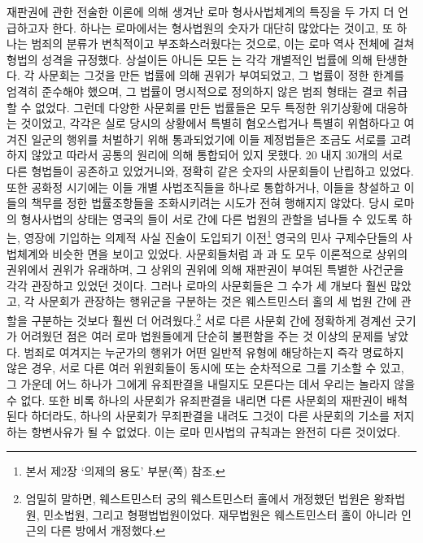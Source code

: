 재판권에 관한 전술한 이론에 의해 생겨난
로마 형사사법체계의 특징을 두 가지 더 언급하고자 한다.
하나는 로마에서는 형사법원의 숫자가 대단히 많았다는 것이고,
또 하나는
범죄의 분류가 변칙적이고 부조화스러웠다는 것으로, 이는
로마 역사 전체에 걸쳐 형법의 성격을 규정했다.
상설이든 아니든 모든 는
각각 개별적인 법률에 의해 탄생한다.
각 사문회는 그것을 만든 법률에 의해 권위가 부여되었고,
그 법률이 정한 한계를 엄격히 준수해야 했으며,
그 법률이 명시적으로 정의하지 않은 범죄 형태는 결코 취급할 수 없었다.
그런데 다양한 사문회를 만든 법률들은
모두 특정한 위기상황에 대응하는 것이었고,
각각은 실로 당시의 상황에서
특별히 혐오스럽거나 특별히 위험하다고 여겨진
일군의 행위를 처벌하기 위해 통과되었기에
이들 제정법들은 조금도 서로를 고려하지 않았고
따라서 공통의 원리에 의해 통합되어 있지 못했다.
20 내지 30개의 서로 다른 형법들이 공존하고 있었거니와,
정확히 같은 숫자의 사문회들이 난립하고 있었다.
또한 공화정 시기에는
이들 개별 사법조직들을 하나로 통합하거나,
이들을 창설하고 이들의 책무를 정한 법률조항들을 조화시키려는
시도가 전혀 행해지지 않았다.
당시 로마의 형사사법의 상태는
영국의 들이
서로 간에 다른 법원의 관할을 넘나들 수 있도록 하는,
영장에 기입하는
의제적 사실 진술이
도입되기 이전\footnote{%
  본서 제2장 `의제의 용도' 부분(\pageref{commonlawfiction}쪽) 참조.}
영국의 민사 구제수단들의 사법체계와
비슷한 면을 보이고 있었다.
사문회들처럼
과 과 도 모두
이론적으로
상위의 권위에서 권위가 유래하며,
그 상위의 권위에 의해 재판권이 부여된
특별한 사건군을 각각 관장하고 있었던 것이다.
그러나 로마의 사문회들은 그 수가 세 개보다 훨씬 많았고,
각 사문회가 관장하는 행위군을 구분하는 것은
웨스트민스터 홀의 세 법원 간에 관할을 구분하는 것보다
훨씬 더 어려웠다.\footnote{%
  엄밀히 말하면, 웨스트민스터 궁의 웨스트민스터 홀에서
  개정했던 법원은 왕좌법원, 민소법원, 그리고 형평법법원이었다.
  재무법원은 웨스트민스터 홀이 아니라 인근의 다른 방에서 개정했다.
  }
서로 다른 사문회 간에 정확하게 경계선 긋기가 어려웠던 점은
여러 로마 법원들에게 단순히 불편함을 주는 것 이상의 문제를 낳았다.
범죄로 여겨지는 누군가의 행위가 어떤 일반적 유형에 해당하는지
즉각 명료하지 않은 경우,
서로 다른 여러 위원회들이
동시에 또는 순차적으로 그를 기소할 수 있고,
그 가운데 어느 하나가
그에게 유죄판결을 내릴지도 모른다는 데서
우리는 놀라지 않을 수 없다.
또한 비록 하나의 사문회가 유죄판결을 내리면
다른 사문회의 재판권이 배척된다 하더라도,
하나의 사문회가 무죄판결을 내려도 그것이
다른 사문회의 기소를 저지하는 항변사유가 될 수 없었다.
이는 로마 민사법의 규칙과는 완전히 다른 것이었다.
